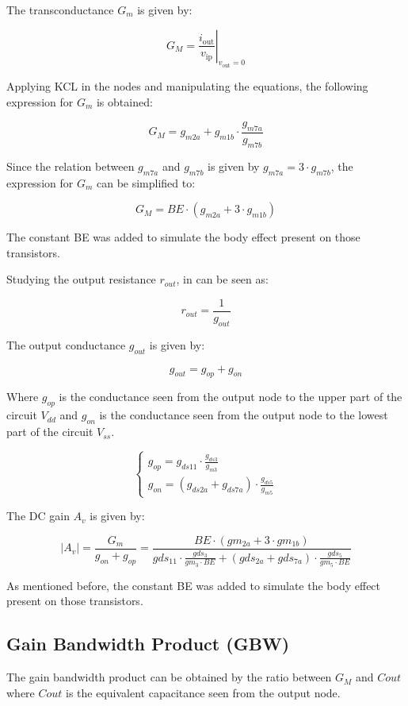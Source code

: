 The transconductance $G_m$ is given by:

$$G_M = \left. \frac{i_{\text{out}}}{v_{\text{ip}}} \right|_{v_{\text{out}}=0}$$

Applying KCL in the nodes and manipulating the equations, the following expression for $G_m$ is obtained:

$$G_M = g_{m2a} + g_{m1b} \cdot \frac{g_{m7a}}{g_{m7b}}$$

Since the relation between $g_{m7a}$ and $g_{m7b}$ is given by $g_{m7a} = 3 \cdot g_{m7b}$, the expression for $G_m$ can be simplified to:  

$$G_M = BE \cdot (g_{m2a} + 3 \cdot g_{m1b})$$

The constant BE was added to simulate the body effect present on those transistors.

Studying the output resistance $r_{out}$, in can be seen as:

$$r_{out} = \frac{1}{g_{out}}$$

The output conductance $g_{out}$ is given by:

$$g_{out} = g_{op} + g_{on}$$

Where $g_{op}$ is the conductance seen from the output node to the upper part of the circuit $V_{dd}$ and $g_{on}$ is the conductance seen from the output node to the lowest part of the circuit $V_{ss}$.

\begin{equation}
    \begin{cases}
        g_{op} = g_{ds11} \cdot \frac{g_{ds3}}{g_{m3}} \\
        g_{on} = \left( g_{ds2a} + g_{ds7a} \right) \cdot \frac{g_{ds5}}{g_{m5}}
    \end{cases}
\end{equation}

The DC gain $A_v$ is given by:

$$|A_v| = \frac{G_m}{g_{on} + g_{op}} = \frac{BE \cdot (gm_{2a} + 3 \cdot gm_{1b})}{gds_{11} \cdot \frac{gds_{3}}{gm_{3}\cdot BE} + (gds_{2a} + gds_{7a}) \cdot \frac{gds_{5}}{gm_{5} \cdot BE}}$$

As mentioned before, the constant BE was added to simulate the body effect present on those transistors.


\subsection{Gain Bandwidth Product (GBW)}
The gain bandwidth product can be obtained by the ratio between $G_M$ and $C{out}$ where $C{out}$ is the equivalent capacitance seen from the output node.


